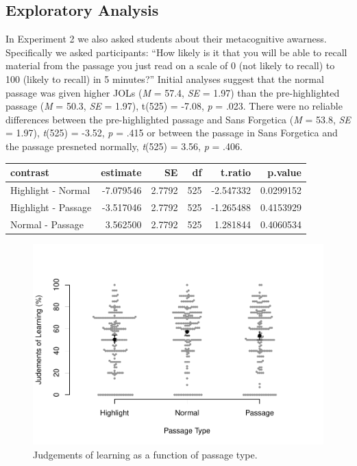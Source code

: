 \documentclass[english,doc]{apa6}
\begin{document}
\hypertarget{exploratory-analysis}{%
\subsection{Exploratory Analysis}\label{exploratory-analysis}}

In Experiment 2 we also asked students about their metacognitive awarness. Specifically we asked participants: \enquote{How likely is it that you will be able to recall material from the passage you just read on a scale of 0 (not likely to recall) to 100 (likely to recall) in 5 minutes?} Initial analyses suggest that the normal passage was given higher JOLs (\emph{M} = 57.4, \emph{SE} = 1.97) than the pre-highlighted passage (\emph{M} = 50.3, \emph{SE} = 1.97), t(525) = -7.08, \emph{p} = .023. There were no reliable differences between the pre-highlighted passage and Sans Forgetica (\emph{M} = 53.8, \emph{SE} = 1.97), \emph{t}(525) = -3.52, \emph{p} = .415 or between the passage in Sans Forgetica and the passage presneted normally, \emph{t}(525) = 3.56, \emph{p} = .406.

\begin{tabular}{l|r|r|r|r|r}
\hline
contrast & estimate & SE & df & t.ratio & p.value\\
\hline
Highlight - Normal & -7.079546 & 2.7792 & 525 & -2.547332 & 0.0299152\\
\hline
Highlight - Passage & -3.517046 & 2.7792 & 525 & -1.265488 & 0.4153929\\
\hline
Normal - Passage & 3.562500 & 2.7792 & 525 & 1.281844 & 0.4060534\\
\hline
\end{tabular}

\begin{figure}

{\centering \includegraphics{SF_Paper_files/figure-latex/unnamed-chunk-4-1} 

}

\caption{Judgements of learning as a function of passage type.}\label{fig:unnamed-chunk-4}
\end{figure}
\end{document}
